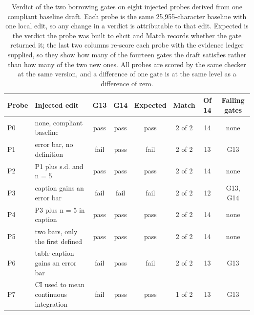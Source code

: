 \begin{table}[t]
\centering
\caption{Verdict of the two borrowing gates on eight injected probes derived from one compliant baseline draft. Each probe is the same 25,955-character baseline with one local edit, so any change in a verdict is attributable to that edit. Expected is the verdict the probe was built to elicit and Match records whether the gate returned it; the last two columns re-score each probe with the evidence ledger supplied, so they show how many of the fourteen gates the draft satisfies rather than how many of the two new ones. All probes are scored by the same checker at the same version, and a difference of one gate is at the same level as a difference of zero.}
\label{tab:tab-probes}
\begin{tabular}{llcccccc}
\toprule
\textbf{Probe} & \textbf{Injected edit} & \textbf{G13} & \textbf{G14} & \textbf{Expected} & \textbf{Match} & \textbf{Of 14} & \textbf{Failing gates} \\
\midrule
P0 & none, compliant baseline & pass & pass & pass & 2 of 2 & 14 & none \\
P1 & error bar, no definition & fail & pass & fail & 2 of 2 & 13 & G13 \\
P2 & P1 plus s.d. and n = 5 & pass & pass & pass & 2 of 2 & 14 & none \\
P3 & caption gains an error bar & fail & fail & fail & 2 of 2 & 12 & G13, G14 \\
P4 & P3 plus n = 5 in caption & pass & pass & pass & 2 of 2 & 14 & none \\
P5 & two bars, only the first defined & pass & pass & pass & 2 of 2 & 14 & none \\
P6 & table caption gains an error bar & fail & pass & fail & 2 of 2 & 13 & G13 \\
P7 & CI used to mean continuous integration & fail & pass & pass & 1 of 2 & 13 & G13 \\
\bottomrule
\end{tabular}
\end{table}
